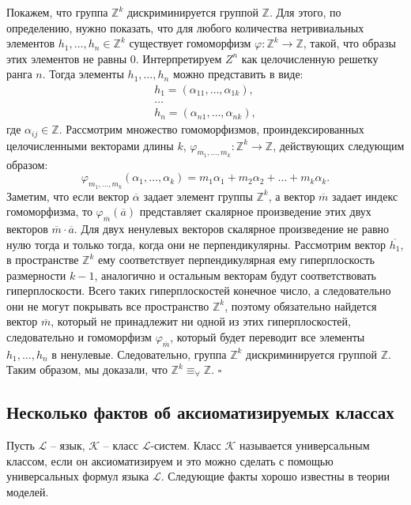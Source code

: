 \documentclass[a4paper,11pt,twoside]{article}
\def\K{{\mathcal{K}}}
\def\L{{\mathcal{L}}}
\def\Z{{\mathbb{Z}}}
\begin{document}
Покажем, что группа $\Z^k$ дискриминируется группой $\Z$. Для этого, по определению, нужно показать, что для любого количества нетривиальных элементов $h_1, \ldots, h_n \in \Z^k$ существует гомоморфизм $\varphi : \Z^k \rightarrow \Z$, такой, что образы этих элементов не равны 0. Интерпретируем $Z^n$ как целочисленную решетку ранга $n$. Тогда элементы $h_1, \ldots, h_n$ можно представить в виде:
$$\begin{array}{c}
 h_1 = (\alpha_{11}, \ldots, \alpha_{1k}), \\
 \ldots \\
 h_n = (\alpha_{n1}, \ldots, \alpha_{nk}),
 \end{array} $$
где $\alpha_{ij} \in \Z$. Рассмотрим множество гомоморфизмов, проиндексированных целочисленными векторами длины $k$, $\varphi_{m_1,\ldots,m_k} : \Z^k \rightarrow \Z$, действующих следующим образом:
$$\varphi_{m_1,\ldots,m_k} (\alpha_1, \ldots, \alpha_k) = m_1 \alpha_1 + m_2 \alpha_2 + \ldots + m_k \alpha_k.$$
Заметим, что если вектор $\overline{\alpha}$ задает элемент группы $\Z^k$, а вектор $\overline{m}$ задает индекс гомоморфизма, то $\varphi_{\overline{m}}(\overline{a})$ представляет скалярное произведение этих двух векторов $\overline{m} \cdot \overline{a}$. Для двух ненулевых векторов скалярное произведение не равно нулю тогда и только тогда, когда они не перпендикулярны. Рассмотрим вектор $\overline{h_1}$, в пространстве $\Z^k$ ему соответствует перпендикулярная ему гиперплоскость размерности $k-1$, аналогично и остальным векторам будут соответствовать гиперплоскости. Всего таких гиперплоскостей конечное число, а следовательно они не могут покрывать все пространство $\Z^k$, поэтому обязательно найдется вектор $\overline{m}$, который не принадлежит ни одной из этих гиперплоскостей, следовательно и гомоморфизм $\varphi_{\overline{m}}$, который будет переводит все элементы $h_1,\ldots, h_n$ в ненулевые. Следовательно, группа $\Z^k$ дискриминируется группой $\Z$. Таким образом, мы доказали, что $\Z^k \equiv_{\forall} \Z$. $\square$



\subsection{Несколько фактов об аксиоматизируемых классах}

Пусть $\L$ -- язык, $\K$ -- класс $\L$-систем. Класс $\K$ называется универсальным классом, если он аксиоматизируем и это можно сделать с помощью универсальных формул языка $\L$. Следующие факты хорошо известны в теории моделей.
\end{document}

